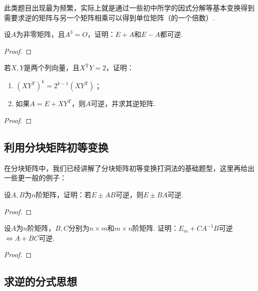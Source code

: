 此类题目出现最为频繁，实际上就是通过一些初中所学的因式分解等基本变换得到需要求逆的矩阵与另一个矩阵相乘可以得到单位矩阵（的一个倍数）.
\begin{example}
    设$A$为非零矩阵，且$A^3=O$，证明：$E+A$和$E-A$都可逆.
\end{example}

\begin{proof}

\end{proof}

\begin{example}
    若$X,Y$是两个列向量，且$X^\mathrm{T}Y=2$，证明：
    \begin{enumerate}
        \item $(XY^\mathrm{T})^k=2^{k-1}(XY^{\mathrm{T}})$；

        \item 如果$A=E+XY^\mathrm{T}$，则$A$可逆，并求其逆矩阵.
    \end{enumerate}
\end{example}

\begin{proof}

\end{proof}

\subsection{利用分块矩阵初等变换}

在分块矩阵中，我们已经讲解了分块矩阵初等变换打洞法的基础题型，这里再给出一些更一般的例子：
\begin{example}\label{ex:12:打洞法求逆1}
    设$A,B$为$n$阶矩阵，证明：若$E\pm AB$可逆，则$E\pm BA$可逆.
\end{example}

\begin{proof}

\end{proof}

\begin{example}
    设$A$为$n$阶矩阵，$B,C$分别为$n \times m$和$m \times n$阶矩阵. 证明：$E_m+CA^{-1}B$可逆$\iff A+BC$可逆.
\end{example}

\begin{proof}

\end{proof}

\subsection{求逆的分式思想}

